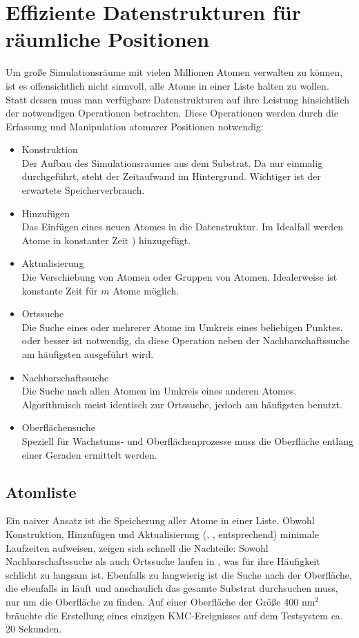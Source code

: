 \section{Effiziente Datenstrukturen für räumliche Positionen}

Um große Simulationsräume mit vielen Millionen Atomen verwalten zu können, ist es offensichtlich nicht sinnvoll, alle Atome in einer Liste halten zu wollen.
Statt dessen muss man verfügbare Datenstrukturen auf ihre Leistung hinsichtlich der notwendigen Operationen betrachten.
Diese Operationen werden durch die Erfassung und Manipulation atomarer Positionen notwendig:

\begin{itemize}
\item Konstruktion \\
Der Aufbau des Simulationsraumes aus dem Substrat. Da nur einmalig durchgeführt, steht der Zeitaufwand im Hintergrund. Wichtiger ist der erwartete Speicherverbrauch.
\item Hinzufügen \\
Das Einfügen eines neuen Atomes in die Datenstruktur. Im Idealfall werden Atome in konstanter Zeit ) hinzugefügt.
\item Aktualisierung \\
Die Verschiebung von Atomen oder Gruppen von Atomen. Idealerweise ist konstante Zeit  für $m$ Atome möglich.
\item Ortssuche \\
Die Suche eines oder mehrerer Atome im Umkreis eines beliebigen Punktes.  oder besser ist notwendig, da diese Operation neben der Nachbarschaftssuche am häufigsten ausgeführt wird.
\item Nachbarschaftssuche \\
Die Suche nach allen Atomen im Umkreis eines anderen Atomes. Algorithmisch meist identisch zur Ortssuche, jedoch am häufigsten benutzt.
\item Oberflächensuche \\
Speziell für Wachstums- und Oberflächenprozesse muss die Oberfläche entlang einer Geraden ermittelt werden.
\end{itemize}

\subsection{Atomliste}

Ein naiver Ansatz ist die Speicherung aller Atome in einer Liste.
Obwohl Konstruktion, Hinzufügen und Aktualisierung (, ,  entsprechend) minimale Laufzeiten aufweisen, zeigen sich schnell die Nachteile:
Sowohl Nachbarschaftssuche als auch Ortssuche laufen in , was für ihre Häufigkeit schlicht zu langsam ist.
Ebenfalls zu langwierig ist die Suche nach der Oberfläche, die ebenfalls in  läuft und anschaulich das gesamte Substrat durchsuchen muss, nur um die Oberfläche zu finden.
Auf einer Oberfläche der Größe 400 nm$^2$ bräuchte die Erstellung eines einzigen KMC-Ereignisses auf dem Testsystem ca. 20 Sekunden.

